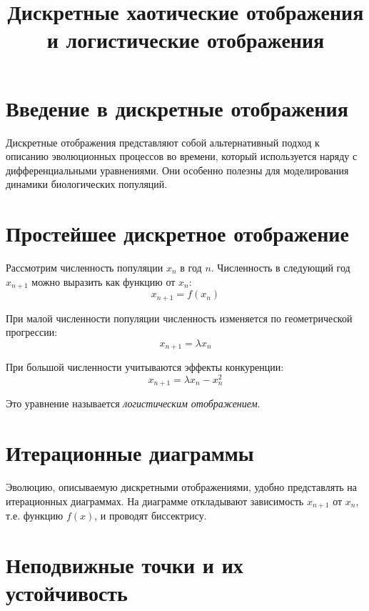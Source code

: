 \documentclass[a4paper,12pt]{article}
\title{Дискретные хаотические отображения и логистические отображения}
\author{}
\date{}
\begin{document}
\maketitle

\section{Введение в дискретные отображения}

Дискретные отображения представляют собой альтернативный подход к описанию эволюционных процессов во времени, который используется наряду с дифференциальными уравнениями. Они особенно полезны для моделирования динамики биологических популяций.

\section{Простейшее дискретное отображение}

Рассмотрим численность популяции $x_n$ в год $n$. Численность в следующий год $x_{n+1}$ можно выразить как функцию от $x_n$:
\begin{equation}
x_{n+1} = f(x_n)
\end{equation}

При малой численности популяции численность изменяется по геометрической прогрессии:
\begin{equation}
x_{n+1} = \lambda x_n
\end{equation}

При большой численности учитываются эффекты конкуренции:
\begin{equation}
x_{n+1} = \lambda x_n - x_n^2
\end{equation}

Это уравнение называется \textit{логистическим отображением}.

\section{Итерационные диаграммы}

Эволюцию, описываемую дискретными отображениями, удобно представлять на итерационных диаграммах. На диаграмме откладывают зависимость $x_{n+1}$ от $x_n$, т.е. функцию $f(x)$, и проводят биссектрису.

\section{Неподвижные точки и их устойчивость}
\end{document}
